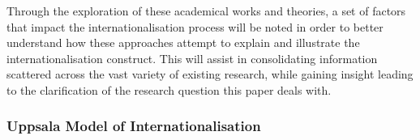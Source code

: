 \documentclass[11pt,a4paper]{article}
\begin{document}
 \par 
Through the exploration of these academical works and theories, a set of factors that impact the internationalisation process will be noted in order to better understand how these approaches attempt to explain and illustrate the internationalisation construct. This will assist in consolidating information scattered across the vast variety of existing research, while gaining insight leading to the clarification of the research question this paper deals with. 

\subsubsection{Uppsala Model of Internationalisation}
\label{uppsala_frame}
\end{document}
